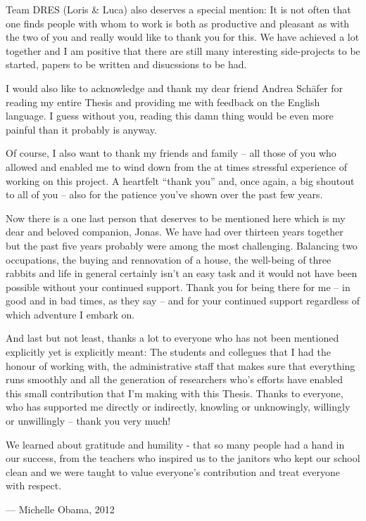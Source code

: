 Team DRES (Loris \& Luca) also deserves a special mention: It is not often that one finds people with whom to work is both as productive and pleasant as with the two of you and really would like to thank you for this. We have achieved a lot together and I am positive that there are still many interesting side-projects to be started, papers to be written and disucssions to be had.

I would also like to acknowledge and thank my dear friend Andrea Schäfer for reading my entire Thesis and providing me with feedback on the English language. I guess without you, reading this damn thing would be even more painful than it probably is anyway.

Of course, I also want to thank my friends and family -- all those of you who allowed and enabled me to wind down from the at times stressful experience of working on this project. A heartfelt ``thank you'' and, once again, a big shoutout to all of you -- also for the patience you've shown over the past few years.

Now there is a one last person that deserves to be mentioned here which is my dear and beloved companion, Jonas. We have had over thirteen years together but the past five years probably were among the most challenging. Balancing two occupations, the buying and rennovation of a house, the well-being of three rabbits and life in general certainly isn't an easy task and it would not have been possible without your continued support. Thank you for being there for me -- in good and in bad times, as they say -- and for your continued support regardless of which adventure I embark on.

And last but not least, thanks a lot to everyone who has not been mentioned explicitly yet is explicitly meant: The students and collegues that I had the honour of working with, the administrative staff that makes sure that everything runs smoothly and all the generation of researchers who's efforts have enabled this small contribution that I'm making with this Thesis. Thanks to everyone, who has supported me directly or indirectly, knowling or unknowingly, willingly or unwillingly -- thank you very much!

\epigraph{We learned about gratitude and humility - that so many people had a hand in our success, from the teachers who inspired us to the janitors who kept our school clean and we were taught to value everyone's contribution and treat everyone with respect.}{--- \textup{Michelle Obama}, 2012}


\cleardoublepage
